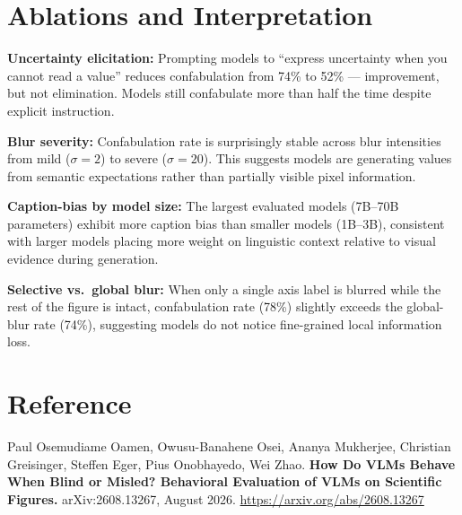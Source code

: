\documentclass[10pt,twocolumn]{article}
\begin{document}
\section{Ablations and Interpretation}

\textbf{Uncertainty elicitation:} Prompting models to ``express
uncertainty when you cannot read a value'' reduces confabulation
from 74\% to 52\% --- improvement, but not elimination. Models still
confabulate more than half the time despite explicit instruction.

\textbf{Blur severity:} Confabulation rate is surprisingly stable
across blur intensities from mild ($\sigma=2$) to severe ($\sigma=20$).
This suggests models are generating values from semantic expectations
rather than partially visible pixel information.

\textbf{Caption-bias by model size:} The largest evaluated models
(7B--70B parameters) exhibit more caption bias than smaller models
(1B--3B), consistent with larger models placing more weight on
linguistic context relative to visual evidence during generation.

\textbf{Selective vs.\ global blur:} When only a single axis label
is blurred while the rest of the figure is intact, confabulation
rate (78\%) slightly exceeds the global-blur rate (74\%), suggesting
models do not notice fine-grained local information loss.

\section*{Reference}

Paul Osemudiame Oamen, Owusu-Banahene Osei, Ananya Mukherjee,
Christian Greisinger, Steffen Eger, Pius Onobhayedo, Wei Zhao.
\textbf{How Do VLMs Behave When Blind or Misled? Behavioral
Evaluation of VLMs on Scientific Figures.}
arXiv:2608.13267, August 2026.
\url{https://arxiv.org/abs/2608.13267}
\end{document}
